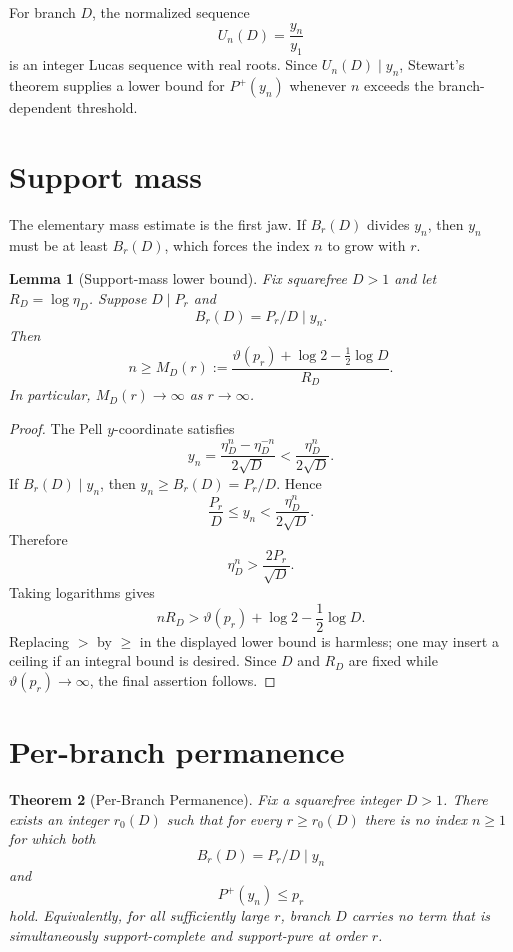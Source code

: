 \documentclass[11pt]{article}
\newtheorem{theorem}{Theorem}[section]
\newtheorem{lemma}[theorem]{Lemma}
\theoremstyle{definition}
\newcommand{\Pplus}{P^{+}}
\newcommand{\thetafun}{\vartheta}
\begin{document}
For branch $D$, the normalized sequence
\[
  U_n(D)=\frac{y_n}{y_1}
\]
is an integer Lucas sequence with real roots.  Since $U_n(D)\mid y_n$,
Stewart's theorem supplies a lower bound for $\Pplus(y_n)$ whenever $n$ exceeds
the branch-dependent threshold.

\section{Support mass}

The elementary mass estimate is the first jaw.  If $B_r(D)$ divides $y_n$, then
$y_n$ must be at least $B_r(D)$, which forces the index $n$ to grow with $r$.

\begin{lemma}[Support-mass lower bound]\label{lem:mass}
Fix squarefree $D>1$ and let $R_D=\log\eta_D$.  Suppose $D\mid P_r$ and
\[
  B_r(D)=P_r/D\mid y_n.
\]
Then
\[
  n\ge
  M_D(r):=
  \frac{\thetafun(p_r)+\log 2-\frac12\log D}{R_D}.
\]
In particular, $M_D(r)\to\infty$ as $r\to\infty$.
\end{lemma}

\begin{proof}
The Pell $y$-coordinate satisfies
\[
  y_n=\frac{\eta_D^n-\eta_D^{-n}}{2\sqrt D}
  <
  \frac{\eta_D^n}{2\sqrt D}.
\]
If $B_r(D)\mid y_n$, then $y_n\ge B_r(D)=P_r/D$.  Hence
\[
  \frac{P_r}{D}
  \le y_n
  <
  \frac{\eta_D^n}{2\sqrt D}.
\]
Therefore
\[
  \eta_D^n>\frac{2P_r}{\sqrt D}.
\]
Taking logarithms gives
\[
  nR_D>\thetafun(p_r)+\log 2-\frac12\log D.
\]
Replacing $>$ by $\ge$ in the displayed lower bound is harmless; one may insert a
ceiling if an integral bound is desired.  Since $D$ and $R_D$ are fixed while
$\thetafun(p_r)\to\infty$, the final assertion follows.
\end{proof}

\section{Per-branch permanence}

\begin{theorem}[Per-Branch Permanence]\label{thm:permanence}
Fix a squarefree integer $D>1$.  There exists an integer $r_0(D)$ such that for
every $r\ge r_0(D)$ there is no index $n\ge1$ for which both
\[
  B_r(D)=P_r/D\mid y_n
\]
and
\[
  \Pplus(y_n)\le p_r
\]
hold.  Equivalently, for all sufficiently large $r$, branch $D$ carries no term
that is simultaneously support-complete and support-pure at order $r$.
\end{theorem}
\end{document}
